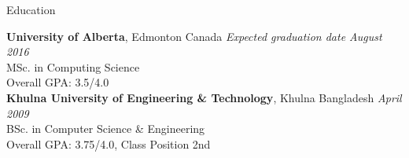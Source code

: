 \documentclass{resume} %
\begin{document}

\begin{rSection}{Education}

{\bf University of Alberta}, Edmonton Canada \hfill {\em Expected graduation date August 2016}\\ 
MSc. in Computing Science \\
Overall GPA: 3.5/4.0\\
{\bf Khulna University of Engineering \& Technology}, Khulna Bangladesh \hfill {\em April 2009} \\ 
BSc. in Computer Science \& Engineering\\
Overall GPA: 3.75/4.0, Class Position 2nd

\end{rSection}

\end{document}
